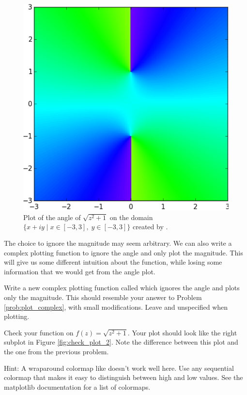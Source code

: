\begin{figure}[H]
\includegraphics[width=.6\textwidth]{figures/check_plot.pdf}
\caption{Plot of the angle of $\sqrt{z^2+1}$ on the domain $\{x+iy \mid x \in [-3,3] , \; y \in [-3,3]\}$ created by .}
\label{fig:check_plot}
\end{figure}

The choice to ignore the magnitude may seem arbitrary.
We can also write a complex plotting function to ignore the angle and only plot the magnitude.
This will give us some different intuition about the function, while losing some information that we would get from the angle plot.

\begin{problem}
Write a new complex plotting function called  which ignores the angle and plots only the magnitude.
This should resemble your answer to Problem \ref{prob:plot_complex}, with small modifications.
Leave  and  unspecified when plotting.

Check your function on $f(z) = \sqrt{z^2+1}$.
Your plot should look like the right subplot in Figure \ref{fig:check_plot_2}.
Note the difference between this plot and the one from the previous problem.

Hint: A wraparound colormap like  doesn't work well here.
Use any sequential colormap that makes it easy to distinguish between high and low values. See the matplotlib documentation for a list of colormaps.

\end{problem}

